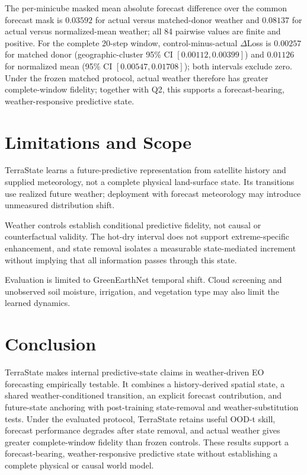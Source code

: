 \documentclass[letterpaper]{article} %
\begin{document}
The per-minicube masked mean absolute forecast difference over the common
forecast mask is $0.03592$ for actual versus matched-donor weather and $0.08137$
for actual versus normalized-mean weather; all 84 pairwise values are finite
and positive. For the complete 20-step window, control-minus-actual
$\Delta$Loss is $0.00257$ for matched donor
(geographic-cluster 95\% CI $[0.00112,0.00399]$) and $0.01126$ for normalized
mean (95\% CI $[0.00547,0.01708]$); both intervals exclude zero. Under the
frozen matched protocol, actual weather therefore has greater complete-window
fidelity; together with Q2, this supports a forecast-bearing,
weather-responsive predictive state.

\section{Limitations and Scope}

TerraState learns a future-predictive representation from satellite history and
supplied meteorology, not a complete physical land-surface state. Its
transitions use realized future weather; deployment with forecast meteorology
may introduce unmeasured distribution shift.

Weather controls establish conditional predictive fidelity, not causal or
counterfactual validity. The hot-dry interval does not support extreme-specific
enhancement, and state removal isolates a measurable state-mediated increment
without implying that all information passes through this state.

Evaluation is limited to GreenEarthNet temporal shift. Cloud screening and
unobserved soil moisture, irrigation, and vegetation type may also limit the
learned dynamics.

\section{Conclusion}

TerraState makes internal predictive-state claims in weather-driven EO
forecasting empirically testable. It combines a history-derived spatial state,
a shared weather-conditioned transition, an explicit forecast contribution,
and future-state anchoring with post-training state-removal and
weather-substitution tests. Under the evaluated protocol, TerraState retains
useful OOD-t skill, forecast performance degrades after state removal, and
actual weather gives greater complete-window fidelity than frozen controls.
These results support a forecast-bearing, weather-responsive predictive state
without establishing a complete physical or causal world model.


\end{document}
